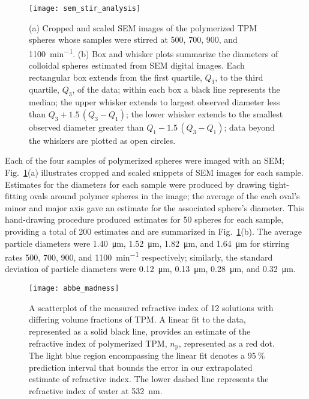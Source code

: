 \begin{figure}
    \centering
    \texttt{[image: sem\_stir\_analysis]}
    \caption{(a) Cropped and scaled SEM images of the polymerized TPM spheres whose
      samples were stirred at \num{500}, \num{700}, \num{900}, and \SI{1100}{\minute^{-1}}.
      (b)  Box and whisker plots summarize the diameters of colloidal spheres estimated from
      SEM digital images. Each rectangular box extends from the first quartile, $Q_1$, to
      the third quartile, $Q_3$, of the data; within each box a black line represents the median;
      the upper whisker extends to largest observed diameter less than $Q_3 + 1.5\, (Q_3 - Q_1)$;
      the lower whisker extends to the smallest observed diameter greater than $Q_1 - 1.5\, (Q_3 - Q_1)$;
      data beyond the whiskers are plotted as open circles. }
    \label{fig:sem_stir_rate}
\end{figure}

Each of the four samples of polymerized spheres were imaged with an SEM;
Fig.~\ref{fig:sem_stir_rate}(a) illustrates cropped and scaled snippets of SEM
images for each sample. Estimates for the diameters for each sample
were produced by drawing tight-fitting ovals around polymer spheres in the image;
the average of the each oval's minor and major axis gave an estimate for the
associated sphere's diameter. This hand-drawing procedure produced estimates
for \num{50} spheres for each sample, providing a total of \num{200} estimates
and are summarized in Fig.~\ref{fig:sem_stir_rate}(b).
The average particle diameters were \SI{1.40}{\um}, \SI{1.52}{\um},
\SI{1.82}{\um}, and \SI{1.64}{\um} for stirring rates \num{500}, \num{700}, \num{900}, and
\SI{1100}{\minute^{-1}} respectively; similarly, the standard deviation of particle diameters
were \SI{0.12}{\um}, \SI{0.13}{\um}, \SI{0.28}{\um}, and \SI{0.32}{\um}.

\begin{figure}
    \centering
    \texttt{[image: abbe\_madness]}
    \caption{A scatterplot of the measured refractive index of \num{12} solutions with differing
      volume fractions of TPM. A linear fit to the data, represented as a solid black line,
      provides an estimate of the refractive index of polymerized TPM, $n_{\text{p}}$, represented as a red dot.
      The light blue region encompassing the linear fit denotes a $\SI{95}{\percent}$ prediction interval
      that bounds the error in our extrapolated estimate of refractive index.
      The lower dashed line represents the refractive index of water at \SI{532}{\nm}.}
    \label{fig:abbe}
\end{figure}

